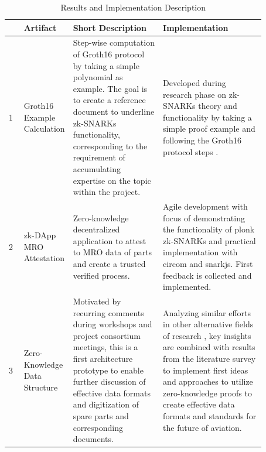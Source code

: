 \setlength{\tabcolsep}{2ex}
\renewcommand{\arraystretch}{1.5}%
\begin{table}[htb]
	\centering
	    \caption{Results and Implementation Description}
		\begin{tabular}{|m{0.001\linewidth} | m{0.12\linewidth} | m{0.35\linewidth} | m{0.4\linewidth} |}
		\hline
		\textbf{}& \textbf{Artifact} & \textbf{Short Description} & \textbf{Implementation} \\ \hline
            1&Groth16 Example \newline Calculation & Step-wise computation of Groth16 protocol by taking a simple polynomial as example. The goal is to create a reference document to underline zk-SNARKs functionality, corresponding to the requirement of accumulating expertise on the topic within the project. & Developed during research phase on zk-SNARKs theory and functionality by taking a simple proof example and following the Groth16 protocol steps \citep{Groth2016OnTS}. \\  \hline
            2&zk-DApp MRO \newline Attestation & Zero-knowledge decentralized application to attest to MRO data of parts and create a trusted verified process. & Agile development with focus of demonstrating the functionality of plonk zk-SNARKs and practical implementation with circom and snarkjs. First feedback is collected and implemented. \\ \hline 
            3&Zero-Knowledge Data \newline Structure & Motivated by recurring comments during workshops and project consortium meetings, this is a first architecture prototype to enable further discussion of effective data formats and digitization of spare parts and corresponding documents. & Analyzing similar efforts in other alternative fields of research \citep{sedlemeirgrenenergy}, key insights are combined with results from the literature survey to implement first ideas and approaches to utilize zero-knowledge proofs to create effective data formats and standards for the future of aviation. \\ \hline 
	\end{tabular}
\label{tab:summary_artifacts}
\end{table}

